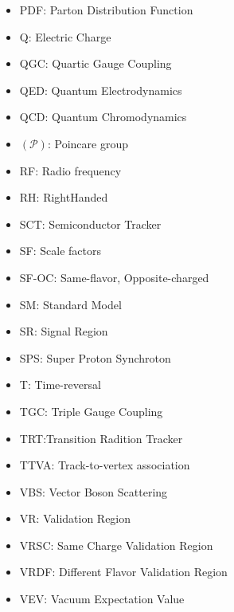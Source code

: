 \begin{itemize}
\item{PDF: Parton Distribution Function}
\item{Q: Electric Charge}
\item{QGC: Quartic Gauge Coupling}
\item{QED: Quantum Electrodynamics}
\item{QCD: Quantum Chromodynamics}
\item{$(\mathcal{P})$: Poincare group}
\item{RF: Radio frequency}
\item{RH: RightHanded}
\item{SCT: Semiconductor Tracker} 
\item{SF: Scale factors}
\item{SF-OC: Same-flavor, Opposite-charged} 
\item{SM: Standard Model}
\item{SR: Signal Region}
\item{SPS: Super Proton Synchroton} 
\item{T: Time-reversal}
\item{TGC: Triple Gauge Coupling}
\item{TRT:Transition Radition Tracker} 
\item{TTVA: Track-to-vertex association}
\item{VBS: Vector Boson Scattering}
\item{VR: Validation Region}
\item{VRSC: Same Charge Validation Region}
\item{VRDF: Different Flavor Validation Region}
\item{VEV: Vacuum Expectation Value}
\end{itemize}
